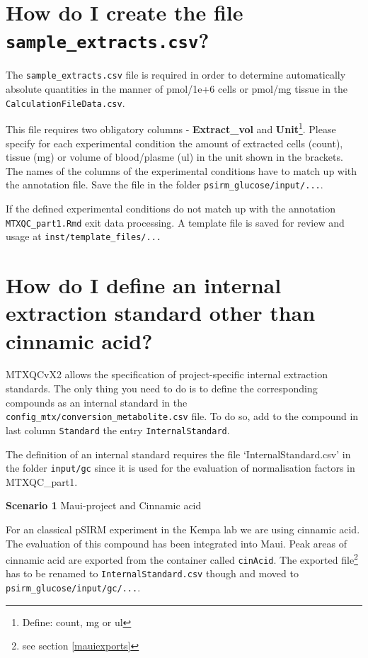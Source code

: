 \documentclass[]{book}
\let\rmarkdownfootnote\footnote%
\def\footnote{\protect\rmarkdownfootnote}
\theoremstyle{definition}
\theoremstyle{definition}
\theoremstyle{definition}
\theoremstyle{remark}
\begin{document}
\section{\texorpdfstring{How do I create the file
\texttt{sample\_extracts.csv}?}{How do I create the file sample\_extracts.csv?}}\label{createsampleextracts}

The \texttt{sample\_extracts.csv} file is required in order to determine
automatically absolute quantities in the manner of pmol/1e+6 cells or
pmol/mg tissue in the \texttt{CalculationFileData.csv}.

This file requires two obligatory columns - \textbf{Extract\_vol} and
\textbf{Unit}\footnote{Define: count, mg or ul}. Please specify for each
experimental condition the amount of extracted cells (count), tissue
(mg) or volume of blood/plasme (ul) in the unit shown in the brackets.\\
The names of the columns of the experimental conditions have to match up
with the annotation file. Save the file in the folder
\texttt{psirm\_glucose/input/...}.

If the defined experimental conditions do not match up with the
annotation \texttt{MTXQC\_part1.Rmd} exit data processing. A template
file is saved for review and usage at \texttt{inst/template\_files/...}

\section{How do I define an internal extraction standard other than
cinnamic acid?}\label{definternal}

MTXQCvX2 allows the specification of project-specific internal
extraction standards. The only thing you need to do is to define the
corresponding compounds as an internal standard in the
\texttt{config\_mtx/conversion\_metabolite.csv} file. To do so, add to
the compound in last column \texttt{Standard} the entry
\texttt{InternalStandard}.

The definition of an internal standard requires the file
`InternalStandard.csv' in the folder \texttt{input/gc} since it is used
for the evaluation of normalisation factors in MTXQC\_part1.

\textbf{Scenario 1} Maui-project and Cinnamic acid

For an classical pSIRM experiment in the Kempa lab we are using cinnamic
acid. The evaluation of this compound has been integrated into Maui.
Peak areas of cinnamic acid are exported from the container called
\texttt{cinAcid}. The exported file\footnote{see section
  \ref{mauiexports}} has to be renamed to \texttt{InternalStandard.csv}
though and moved to \texttt{psirm\_glucose/input/gc/...}.
\end{document}
